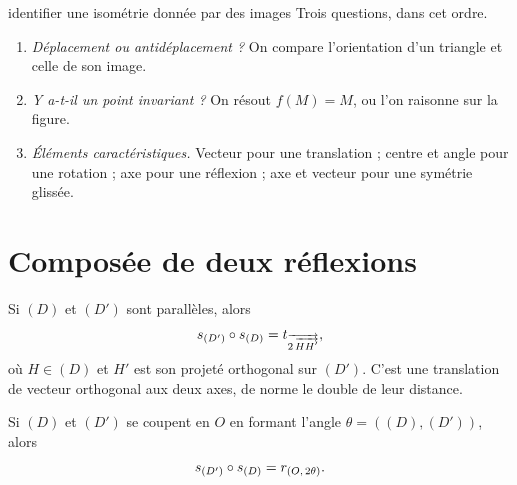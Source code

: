 \begin{methode}{identifier une isométrie donnée par des images}
Trois questions, dans cet ordre.
\begin{enumerate}[label=\textbf{\arabic*.}, leftmargin=*, itemsep=0.15em]
  \item \emph{Déplacement ou antidéplacement ?} On compare l'orientation d'un
        triangle et celle de son image.
  \item \emph{Y a-t-il un point invariant ?} On résout $f(M) = M$, ou l'on
        raisonne sur la figure.
  \item \emph{Éléments caractéristiques.} Vecteur pour une translation ;
        centre et angle pour une rotation ; axe pour une réflexion ; axe et
        vecteur pour une symétrie glissée.
\end{enumerate}
\end{methode}

\section{Composée de deux réflexions}

\begin{theoreme}
Si $(D)$ et $(D')$ sont parallèles, alors
\[
  s_{(D')} \circ s_{(D)} = t_{\overrightarrow{2\,\overrightarrow{HH'}}},
\]
où $H \in (D)$ et $H'$ est son projeté orthogonal sur $(D')$. C'est une
translation de vecteur orthogonal aux deux axes, de norme le double de leur
distance.
\end{theoreme}

\begin{theoreme}
Si $(D)$ et $(D')$ se coupent en $O$ en formant l'angle
$\theta = \left((D),(D')\right)$, alors
\[
  s_{(D')} \circ s_{(D)} = r_{(O,\,2\theta)}.
\]
\end{theoreme}

